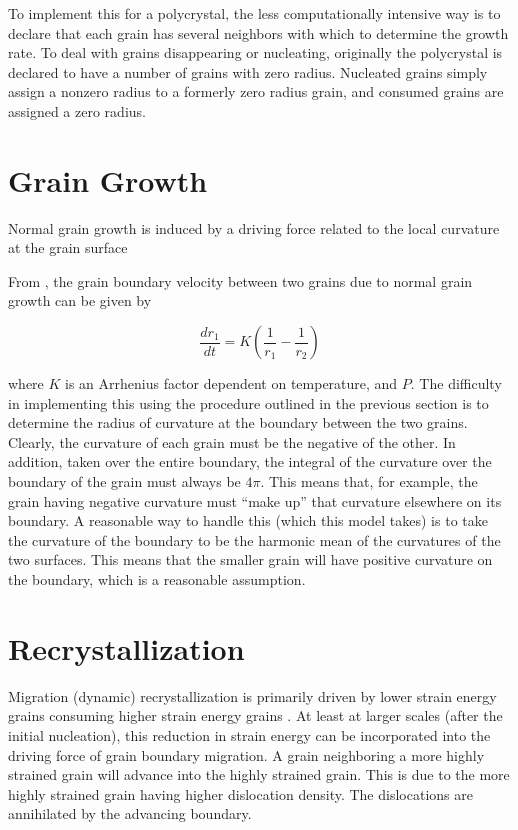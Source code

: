 \documentclass{article}
\begin{document}
To implement this for a polycrystal, the less computationally intensive way is to declare that each grain has several neighbors with which to determine the growth rate. To deal with grains disappearing or nucleating, originally the polycrystal is declared to have a number of grains with zero radius. Nucleated grains simply assign a nonzero radius to a formerly zero radius grain, and consumed grains are assigned a zero radius. 

\section{Grain Growth}
Normal grain growth is induced by a driving force related to the local curvature at the grain surface

From \citet{durand2006}, the grain boundary velocity between two grains due to normal grain growth can be given by

\[\frac{dr_1}{dt} = K \left( \frac{1}{r_1}-\frac{1}{r_2} \right)
\]

where $K$ is an Arrhenius factor dependent on temperature, and $P$. The difficulty in implementing this using the procedure outlined in the previous section is to determine the radius of curvature at the boundary between the two grains. Clearly, the curvature of each grain must be the negative of the other. In addition, taken over the entire boundary, the integral of the curvature over the boundary of the grain must always be $4 \pi$. This means that, for example, the grain having negative curvature must ``make up'' that curvature elsewhere on its boundary. A reasonable way to handle this (which this model takes)  is to take the curvature of the boundary to be the harmonic mean of the curvatures of the two surfaces. This means that the smaller grain will have positive curvature on the boundary, which is a reasonable assumption. 

\section{Recrystallization}
Migration (dynamic) recrystallization is primarily driven by lower strain energy grains consuming higher strain energy grains \citep{duval1995}. At least at larger scales (after the initial nucleation), this reduction in strain energy can be incorporated into the driving force of grain boundary migration. A grain neighboring a more highly strained grain will advance into the highly strained grain. This is due to the more highly strained grain having higher dislocation density. The dislocations are annihilated by the advancing boundary. 
\end{document}
